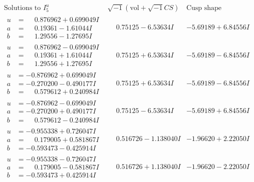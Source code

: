 \documentclass[1p]{elsarticle_modified}
\theoremstyle{definition}
\newcommand{\I}{\sqrt{-1}}
\begin{document}
$$\begin{array}{c|c|c}  
\text{Solutions to }I^u_{5}& \I (\text{vol} + \sqrt{-1}CS) & \text{Cusp shape}\\
 \hline 
\begin{aligned}
u &= \phantom{-}0.876962 + 0.699049 I \\
a &= \phantom{-}0.19361 - 1.61044 I \\
b &= \phantom{-}1.29556 - 1.27695 I\end{aligned}
 & \phantom{-}0.75125 - 6.53634 I & -5.69189 + 6.84556 I \\ \hline\begin{aligned}
u &= \phantom{-}0.876962 - 0.699049 I \\
a &= \phantom{-}0.19361 + 1.61044 I \\
b &= \phantom{-}1.29556 + 1.27695 I\end{aligned}
 & \phantom{-}0.75125 + 6.53634 I & -5.69189 - 6.84556 I \\ \hline\begin{aligned}
u &= -0.876962 + 0.699049 I \\
a &= -0.270200 - 0.490177 I \\
b &= \phantom{-}0.579612 + 0.240984 I\end{aligned}
 & \phantom{-}0.75125 + 6.53634 I & -5.69189 - 6.84556 I \\ \hline\begin{aligned}
u &= -0.876962 - 0.699049 I \\
a &= -0.270200 + 0.490177 I \\
b &= \phantom{-}0.579612 - 0.240984 I\end{aligned}
 & \phantom{-}0.75125 - 6.53634 I & -5.69189 + 6.84556 I \\ \hline\begin{aligned}
u &= -0.955338 + 0.726047 I \\
a &= \phantom{-}0.179005 + 0.581867 I \\
b &= -0.593473 - 0.425914 I\end{aligned}
 & \phantom{-}0.516726 - 1.138040 I & -1.96620 + 2.22050 I \\ \hline\begin{aligned}
u &= -0.955338 - 0.726047 I \\
a &= \phantom{-}0.179005 - 0.581867 I \\
b &= -0.593473 + 0.425914 I\end{aligned}
 & \phantom{-}0.516726 + 1.138040 I & -1.96620 - 2.22050 I \\ \hline\begin{aligned}

\end{aligned}
\end{array}$$
\end{document}
